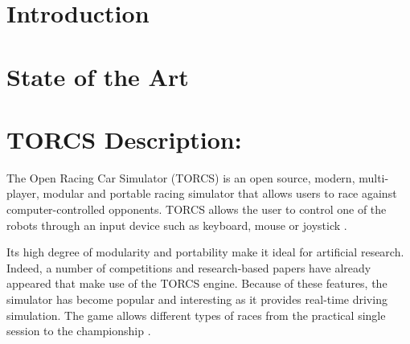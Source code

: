 \documentclass[runningheads,a4paper]{llncs}
\begin{document}
	\section{Introduction}
	\label{sec:intro}


	\section{State of the Art}


	\label{sec:soa}

\section{ TORCS Description: }
	\label{sec:torcs}
The Open Racing Car Simulator (TORCS) is an open source, modern, multi-player, modular and portable racing simulator that allows users to race against computer-controlled opponents. TORCS allows the user to control one of the robots through an input device such as keyboard, mouse or joystick \cite{8}.

Its high degree of modularity and portability make it ideal for artificial research. Indeed, a number of competitions and research-based papers have already appeared that make use of the TORCS \cite{11} engine. Because of these features, the simulator has become popular and interesting as it provides real-time driving simulation. \cite{24} The game allows different types of races from the practical single session to the championship \cite{10}.
\end{document}
